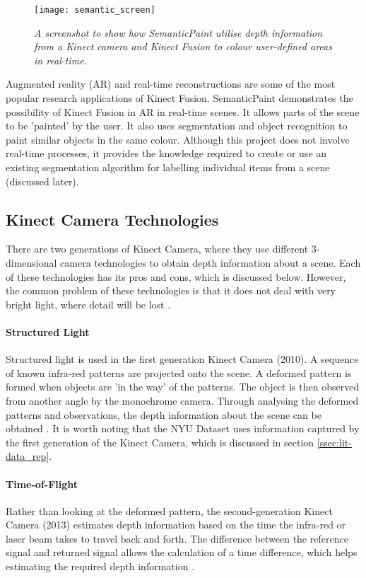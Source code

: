 \begin{figure}[h]
  \centering
  \texttt{[image: semantic\_screen]}
  \caption{\textit{A screenshot to show how SemanticPaint utilise depth information from a Kinect camera and Kinect Fusion to colour user-defined areas in real-time. \protect\cite{semantic-paint}}}
  \label{fig:semantic_screen}
\end{figure}

Augmented reality (AR) and real-time reconstructions are some of the most popular research applications of Kinect Fusion. SemanticPaint \cite{semantic-paint} demonstrates the possibility of Kinect Fusion in AR in real-time scenes. It allows parts of the scene to be 'painted' by the user. It also uses segmentation and object recognition to paint similar objects in the same colour. Although this project does not involve real-time processes, it provides the knowledge required to create or use an existing segmentation algorithm for labelling individual items from a scene (discussed later). 

\subsection{Kinect Camera Technologies}
There are two generations of Kinect Camera, where they use different 3-dimensional camera technologies to obtain depth information about a scene. Each of these technologies has its pros and cons, which is discussed below. However, the common problem of these technologies is that it does not deal with very bright light, where detail will be lost \cite{chi-book}. 

\paragraph*{Structured Light}
Structured light is used in the first generation Kinect Camera (2010). A sequence of known infra-red patterns are projected onto the scene. A deformed pattern is formed when objects are 'in the way' of the patterns. The object is then observed from another angle by the monochrome camera. Through analysing the deformed patterns and observations, the depth information about the scene can be obtained \cite{chi-book}\cite{kinect-cam-tech}. It is worth noting that the NYU Dataset \cite{nyu-dataset} uses information captured by the first generation of the Kinect Camera, which is discussed in section \ref{ssec:lit-data_rep}.

\paragraph*{Time-of-Flight}
Rather than looking at the deformed pattern, the second-generation Kinect Camera (2013) estimates depth information based on the time the infra-red or laser beam takes to travel back and forth. The difference between the reference signal and returned signal allows the calculation of a time difference, which helps estimating the required depth information \cite{chi-book}.  

